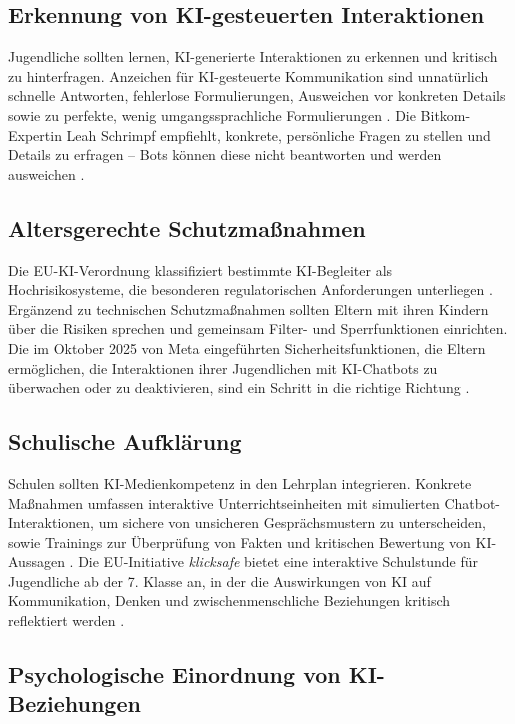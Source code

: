 \documentclass[12pt,a4paper,oneside]{scrartcl}
\begin{document}
	\subsection{Erkennung von KI-gesteuerten Interaktionen}
	
	Jugendliche sollten lernen, KI-generierte Interaktionen zu erkennen und kritisch zu hinterfragen. Anzeichen für KI-gesteuerte Kommunikation sind unnatürlich schnelle Antworten, fehlerlose Formulierungen, Ausweichen vor konkreten Details sowie zu perfekte, wenig umgangssprachliche Formulierungen \cite{Sueddeutsche2025}. Die Bitkom-Expertin Leah Schrimpf empfiehlt, konkrete, persönliche Fragen zu stellen und Details zu erfragen – Bots können diese nicht beantworten und werden ausweichen \cite{Bitkom2025}.
	
	\subsection{Altersgerechte Schutzmaßnahmen}
	
	Die EU-KI-Verordnung klassifiziert bestimmte KI-Begleiter als Hochrisikosysteme, die besonderen regulatorischen Anforderungen unterliegen \cite{KJM2025}. Ergänzend zu technischen Schutzmaßnahmen sollten Eltern mit ihren Kindern über die Risiken sprechen und gemeinsam Filter- und Sperrfunktionen einrichten. Die im Oktober 2025 von Meta eingeführten Sicherheitsfunktionen, die Eltern ermöglichen, die Interaktionen ihrer Jugendlichen mit KI-Chatbots zu überwachen oder zu deaktivieren, sind ein Schritt in die richtige Richtung \cite{eWeek2025}.
	
	\subsection{Schulische Aufklärung}
	
	Schulen sollten KI-Medienkompetenz in den Lehrplan integrieren. Konkrete Maßnahmen umfassen interaktive Unterrichtseinheiten mit simulierten Chatbot-Interaktionen, um sichere von unsicheren Gesprächsmustern zu unterscheiden, sowie Trainings zur Überprüfung von Fakten und kritischen Bewertung von KI-Aussagen \cite{TeacherPlus2025}. Die EU-Initiative \textit{klicksafe} bietet eine interaktive Schulstunde für Jugendliche ab der 7. Klasse an, in der die Auswirkungen von KI auf Kommunikation, Denken und zwischenmenschliche Beziehungen kritisch reflektiert werden \cite{ARAG2026}.
	
	\subsection{Psychologische Einordnung von KI-Beziehungen}
	
\end{document}
